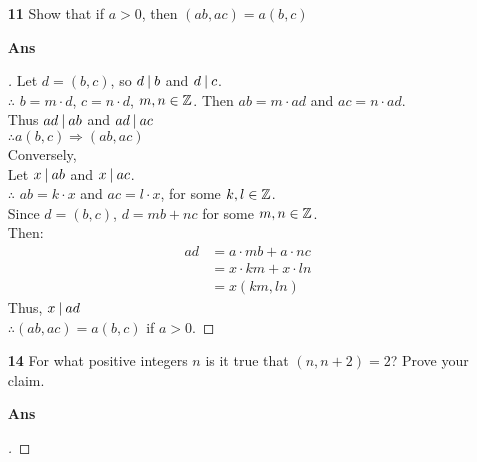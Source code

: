 \documentclass[paper=usletter, fontsize=12pt]{article}
\begin{document}
\begin{itemize}
\begin{itemize}
                \item[\textbf{11}] Show that if $a > 0$, then $(ab, ac) = a(b,
                c)$
                \item[\textbf{Ans}]
                \begin{proof}[\unskip\nopunct]
                    Let $d = (b,c)$, so $d \:\vert\: b$ and $d \:\vert\: c$. \\
                    $\therefore$ $b = m \cdot d$, $c = n \cdot d$, $m, n \in
                    \mathbb{Z}$.
                    Then $ab = m \cdot ad$ and $ac = n \cdot ad$. \\
                    Thus $ad \:\vert\: ab$ and $ad \:\vert\: ac$ \\
                    $\therefore a(b, c) \Rightarrow (ab, ac)$ \\
                    Conversely, \\
                    Let $x \:\vert\: ab$ and $x \:\vert\: ac$. \\
                    $\therefore$ $ab = k \cdot x$ and $ac = l \cdot x$, for
                    some $k, l \in \mathbb{Z}$. \\
                    Since $d = (b,c)$, $d = mb + nc$ for some $m, n \in
                    \mathbb{Z}$. \\
                    Then:
                    \begin{align*}
                        ad & = a \cdot mb + a \cdot nc \\
                        & = x \cdot km + x \cdot ln \\
                        & = x(km, ln)
                    \end{align*}
                    Thus, $x \:\vert\: ad$ \\
                    $\therefore (ab, ac) = a(b,c)$ if $a > 0$. \qedhere
                \end{proof}
                \vspace{0.2in}

                \item[\textbf{14}] For what positive integers $n$ is it true
                that $(n , n + 2) = 2$? Prove your claim.
                \item[\textbf{Ans}]
                \begin{proof}[\unskip\nopunct]
                \end{proof}
                \vspace{0.2in}


\end{itemize}
\end{itemize}
\end{document}
